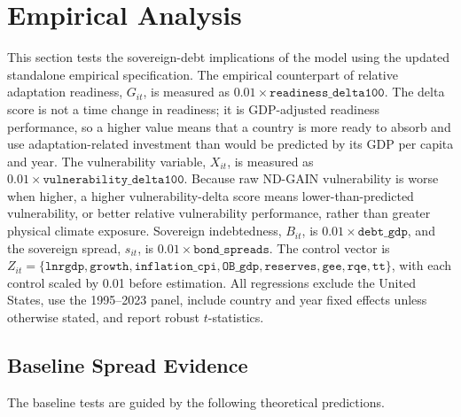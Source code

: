 \documentclass[11pt]{article}
\theoremstyle{definition}
\begin{document}
\section{Empirical Analysis}

This section tests the sovereign-debt implications of the model using the updated standalone empirical specification. The empirical counterpart of relative adaptation readiness, $G_{it}$, is measured as $0.01\times\texttt{readiness\_delta100}$. The delta score is not a time change in readiness; it is GDP-adjusted readiness performance, so a higher value means that a country is more ready to absorb and use adaptation-related investment than would be predicted by its GDP per capita and year. The vulnerability variable, $X_{it}$, is measured as $0.01\times\texttt{vulnerability\_delta100}$. Because raw ND-GAIN vulnerability is worse when higher, a higher vulnerability-delta score means lower-than-predicted vulnerability, or better relative vulnerability performance, rather than greater physical climate exposure. Sovereign indebtedness, $B_{it}$, is $0.01\times\texttt{debt\_gdp}$, and the sovereign spread, $s_{it}$, is $0.01\times\texttt{bond\_spreads}$. The control vector is $Z_{it}=\{\texttt{lnrgdp},\texttt{growth},\texttt{inflation\_cpi},\texttt{OB\_gdp},\texttt{reserves},\texttt{gee},\texttt{rqe},\texttt{tt}\}$, with each control scaled by 0.01 before estimation. All regressions exclude the United States, use the 1995--2023 panel, include country and year fixed effects unless otherwise stated, and report robust $t$-statistics.

\subsection{Baseline Spread Evidence}

The baseline tests are guided by the following theoretical predictions.
\end{document}

